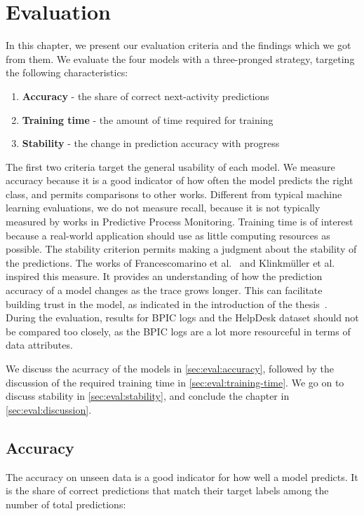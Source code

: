 \chapter{Evaluation}\label{chap:evaluation}
In this chapter, we present our evaluation criteria and the findings which we got from them.
We evaluate the four models with a three-pronged strategy, targeting the following characteristics:

\begin{enumerate}
    \item\textbf{Accuracy} - the share of correct next-activity predictions
    \item\textbf{Training time} - the amount of time required for training
    \item\textbf{Stability} - the change in prediction accuracy with progress
\end{enumerate}

The first two criteria target the general usability of each model.
We measure accuracy because it is a good indicator of how often the model predicts the right class, and permits comparisons to other works.
Different from typical machine learning evaluations, we do not measure recall, because it is not typically measured by works in Predictive Process Monitoring.
Training time is of interest because a real-world application should use as little computing resources as possible.
The stability criterion permits making a judgment about the stability of the predictions. The works of Francescomarino et al.~\cite{francescomarino2015} and Klinkmüller et al.~\cite{klinkmuller2018reliablemonitoring} inspired this measure. It provides an understanding of how the prediction accuracy of a model changes as the trace grows longer. This can facilitate building trust in the model, as indicated in the introduction of the thesis~\cite{klinkmuller2018reliablemonitoring, boehmer2018probability}.
During the evaluation, results for BPIC logs and the HelpDesk dataset should not be compared too closely, as the BPIC logs are a lot more resourceful in terms of data attributes.

We discuss the acurracy of the models in \autoref{sec:eval:accuracy}, followed by the discussion of the required training time in \autoref{sec:eval:training-time}. We go on to discuss stability in \autoref{sec:eval:stability}, and conclude the chapter in \autoref{sec:eval:discussion}.

\section{Accuracy}\label{sec:eval:accuracy}
The accuracy on unseen data is a good indicator for how well a model predicts.
It is the share of correct predictions that match their target labels among the number of total predictions:

